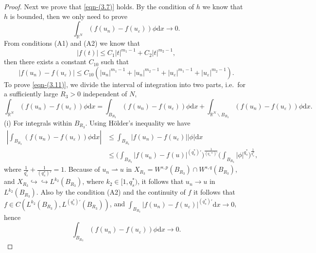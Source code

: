 \documentclass[reqno]{amsart}
\begin{document}
\begin{proof}
Next we prove that \eqref{eqn-(3.7)} holds.
By the condition of $h$ we know that $h$ is bounded, then we only need to prove
\begin{equation}\label{eqn-(3.11)}
\int_{\mathbb{R}^N}(f(u_n)-f(u_\varepsilon))\phi\mathrm{d}x\to0.
\end{equation}
From conditions (A1) and (A2) we know that
$$
|f(t)|\leq C_1|t|^{m_1-1}+C_2|t|^{m_2-1},
$$
then there exists a constant $C_{10}$ such that
$$
|f(u_n)-f(u_\varepsilon)|\leq C_{10}(|u_n|^{m_1-1}+|u_n|^{m_2-1}
+|u_\varepsilon|^{m_1-1}+|u_\varepsilon|^{m_2-1}).
$$
To prove \eqref{eqn-(3.11)}, we divide the interval of integration into two parts, 
i.e.\ for a sufficiently large $R_3>0$ independent of $N$,
$$
\int_{\mathbb{R}^N}(f(u_n)-f(u_\varepsilon))\phi\mathrm{d}x
=\int_{B_{R_3}}(f(u_n)-f(u_\varepsilon))\phi\mathrm{d}x
 +\int_{\mathbb{R}^N\backslash{B_{R_3}}}(f(u_n)-f(u_\varepsilon))\phi\mathrm{d}x.
$$
(i) For integrals within $B_{R_3}$. Using H\"{o}lder's inequality we have
\begin{align*}
|\int_{B_{R_3}}(f(u_n)-f(u_\varepsilon))\phi\mathrm{d}x|
&\le\int_{B_{R_3}}|f(u_n)-f(u_\varepsilon)||\phi|\mathrm{d}x\\
&\le \big(\int_{B_{R_3}}|f(u_n)-f(u)|^{(q_{s}^{*})'}\Big)^{\frac{1}{(q_{s}*)'}}
 \Big(\int_{B_{R_3}}|\phi|^{q_{s}^{*}}\Big)^{\frac{1}{q_{s}^{*}}},
\end{align*}
where $\frac{1}{q_{s}^{*}}+\frac{1}{(q_{s}^{*})'}=1$. 
Because of $u_n\rightharpoonup u$ in $X_{R_3}=W^{s,p}(B_{R_3})\cap W^{s,q}(B_{R_3})$,
 and $X_{R_3}\hookrightarrow\hookrightarrow L^{k_2}(B_{R_3})$, 
 where $k_2\in[1,q_{s}^{*})$, it follows that $u_n\to u$ in $L^{k_2}(B_{R_3})$.
Also by the condition (A2) and the continuity of $f$ it follows that 
$f\in C(L^{k_2}(B_{R_3}),L^{(q_{s}^{*})'}(B_{R_3}))$, and 
$\int_{B_{R_3}}|f(u_n)-f(u_\varepsilon)|^{(q_{s}^{*})'}\mathrm{d}x\to 0$,
hence
$$
\int_{B_{R_3}}(f(u_n)-f(u_\varepsilon))\phi\mathrm{d}x\to 0.
$$


\end{proof}
\end{document}
